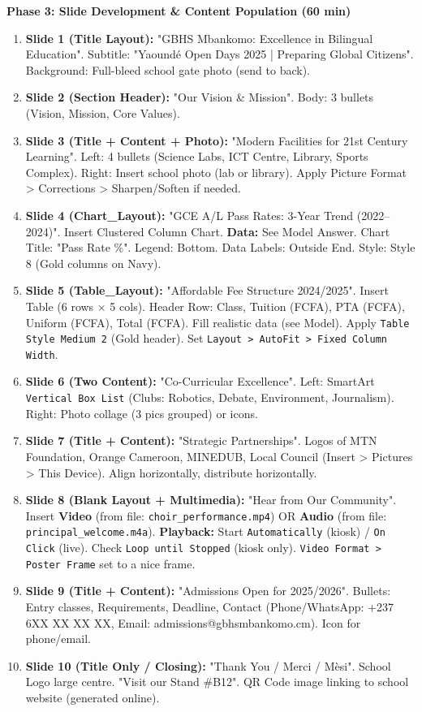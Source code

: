 \documentclass[11pt]{article}
\newcommand{\cle}[1]{{\popxbold\color{popdark}#1}}
\begin{document}
\textbf{Phase 3: Slide Development \& Content Population (60 min)}
\begin{enumerate}[resume]
    \item \textbf{Slide 1 (Title Layout):} "GBHS Mbankomo: Excellence in Bilingual Education". Subtitle: "Yaoundé Open Days 2025 | Preparing Global Citizens". Background: Full-bleed school gate photo (send to back).
    \item \textbf{Slide 2 (Section Header):} "Our Vision \& Mission". Body: 3 bullets (Vision, Mission, Core Values).
    \item \textbf{Slide 3 (Title + Content + Photo):} "Modern Facilities for 21st Century Learning". Left: 4 bullets (Science Labs, ICT Centre, Library, Sports Complex). Right: Insert school photo (lab or library). Apply \cle{Picture Format > Corrections > Sharpen/Soften} if needed.
    \item \textbf{Slide 4 (Chart\_Layout):} "GCE A/L Pass Rates: 3-Year Trend (2022--2024)". Insert Clustered Column Chart. \textbf{Data:} See Model Answer. Chart Title: "Pass Rate \%". Legend: Bottom. Data Labels: Outside End. Style: Style 8 (Gold columns on Navy).
    \item \textbf{Slide 5 (Table\_Layout):} "Affordable Fee Structure 2024/2025". Insert Table (6 rows $\times$ 5 cols). Header Row: Class, Tuition (FCFA), PTA (FCFA), Uniform (FCFA), Total (FCFA). Fill realistic data (see Model). Apply \texttt{Table Style Medium 2} (Gold header). Set \texttt{Layout > AutoFit > Fixed Column Width}.
    \item \textbf{Slide 6 (Two Content):} "Co-Curricular Excellence". Left: SmartArt \texttt{Vertical Box List} (Clubs: Robotics, Debate, Environment, Journalism). Right: Photo collage (3 pics grouped) or icons.
    \item \textbf{Slide 7 (Title + Content):} "Strategic Partnerships". Logos of MTN Foundation, Orange Cameroon, MINEDUB, Local Council (Insert > Pictures > This Device). Align horizontally, distribute horizontally.
    \item \textbf{Slide 8 (Blank Layout + Multimedia):} "Hear from Our Community". Insert \textbf{Video} (from file: \texttt{choir\_performance.mp4}) OR \textbf{Audio} (from file: \texttt{principal\_welcome.m4a}). \textbf{Playback:} Start \texttt{Automatically} (kiosk) / \texttt{On Click} (live). Check \texttt{Loop until Stopped} (kiosk only). \texttt{Video Format > Poster Frame} set to a nice frame.
    \item \textbf{Slide 9 (Title + Content):} "Admissions Open for 2025/2026". Bullets: Entry classes, Requirements, Deadline, Contact (Phone/WhatsApp: +237 6XX XX XX XX, Email: admissions@gbhsmbankomo.cm). Icon for phone/email.
    \item \textbf{Slide 10 (Title Only / Closing):} "Thank You / Merci / Mèsi". School Logo large centre. "Visit our Stand \#B12". QR Code image linking to school website (generated online).
\end{enumerate}
\end{document}
